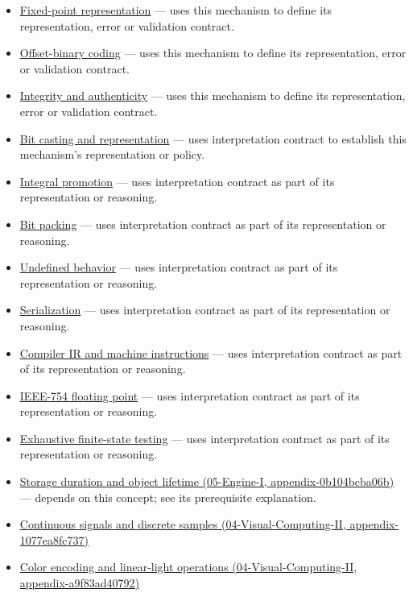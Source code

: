 \begin{itemize}
\tightlist
\item
  \hyperref[appendix-1d0dbe8924cc]{Fixed-point representation} --- uses this mechanism to define its representation, error or validation contract.
\item
  \hyperref[appendix-53a8cfb25f8d]{Offset-binary coding} --- uses this mechanism to define its representation, error or validation contract.
\item
  \hyperref[appendix-cbe594d1ab0a]{Integrity and authenticity} --- uses this mechanism to define its representation, error or validation contract.
\item
  \hyperref[appendix-34ee45f161c1]{Bit casting and representation} --- uses interpretation contract to establish this mechanism's representation or policy.
\item
  \hyperref[appendix-45303d03796a]{Integral promotion} --- uses interpretation contract as part of its representation or reasoning.
\item
  \hyperref[appendix-1f9963e1a5d1]{Bit packing} --- uses interpretation contract as part of its representation or reasoning.
\item
  \hyperref[appendix-f558f5b4d8f2]{Undefined behavior} --- uses interpretation contract as part of its representation or reasoning.
\item
  \hyperref[appendix-91d09ebed979]{Serialization} --- uses interpretation contract as part of its representation or reasoning.
\item
  \hyperref[appendix-942ad41afb30]{Compiler IR and machine instructions} --- uses interpretation contract as part of its representation or reasoning.
\item
  \hyperref[appendix-343615f49ddf]{IEEE-754 floating point} --- uses interpretation contract as part of its representation or reasoning.
\item
  \hyperref[appendix-05db24ccc28a]{Exhaustive finite-state testing} --- uses interpretation contract as part of its representation or reasoning.
\item
  \href{}{Storage duration and object lifetime (05-Engine-I, appendix-0b104bcba06b)} --- depends on this concept; see its prerequisite explanation.
\item
  \href{}{Continuous signals and discrete samples (04-Visual-Computing-II, appendix-1077ea8fc737)}
\item
  \href{}{Color encoding and linear-light operations (04-Visual-Computing-II, appendix-a9f83ad40792)}
\end{itemize}

